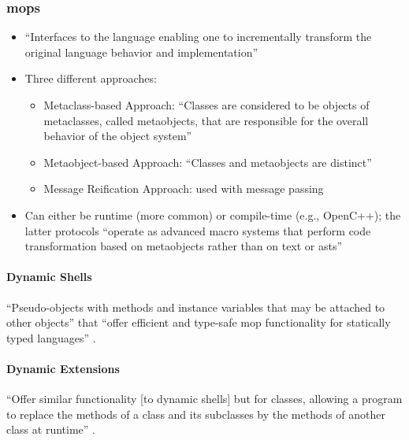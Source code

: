 \subsubsection{\acfp{mop} \citep[p.~113:9-11]{lilis_survey_2019}}
\begin{itemize}
      \item ``Interfaces to the language enabling one to incrementally transform
            the original language behavior and implementation''
            \citep[p.~113:9]{lilis_survey_2019}
      \item Three different approaches:
            \begin{itemize}
                  \item Metaclass-based Approach: ``Classes are considered to be
                        objects of metaclasses, called metaobjects, that are
                        responsible for the overall behavior of the object
                        system'' \citep[p.~113:9]{lilis_survey_2019}
                  \item Metaobject-based Approach: ``Classes and metaobjects are
                        distinct'' \citep[p.~113:9]{lilis_survey_2019}
                  \item Message Reification Approach: used with message passing
                        \citep[p.~113:9]{lilis_survey_2019}
            \end{itemize}
      \item Can either be runtime (more common) or compile-time (e.g., OpenC++);
            the latter protocols ``operate as advanced macro systems that perform
            code transformation based on metaobjects rather than on text or
            \acsp{ast}'' \citep[p.~113:11]{lilis_survey_2019}
\end{itemize}

\paragraph{Dynamic Shells}
``Pseudo-objects with methods and instance variables that may be attached to
other objects'' that ``offer efficient and type-safe \acs{mop} functionality for
statically typed languages'' \citep[p.~113:10]{lilis_survey_2019}.

\paragraph{Dynamic Extensions}
``Offer similar functionality [to dynamic shells] but for classes, allowing a
program to replace the methods of a class and its subclasses by the methods of
another class at runtime'' \citep[p.~113:10]{lilis_survey_2019}.

